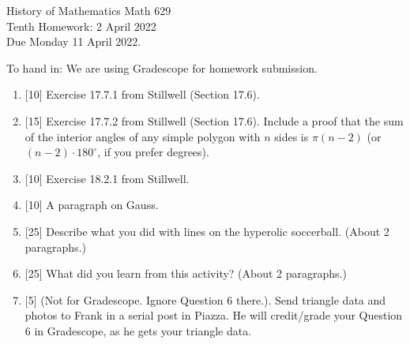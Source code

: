 \documentclass[12pt]{article}
\begin{document}
\LARGE 
\noindent
{\color{Maroon}History of Mathematics \hfill Math 629}\vspace{2pt}\\
\large
Tenth Homework: \hfill 2 April 2022\\
Due Monday 11 April 2022.
\normalsize\vspace{10pt}

To hand in: We are using Gradescope for homework submission.


\begin{enumerate}

\item  {[10]}
     Exercise 17.7.1 from Stillwell (Section 17.6).
\item  {[15]}
  Exercise 17.7.2 from Stillwell (Section 17.6).
  Include a proof that the sum of the interior angles of any simple polygon with $n$ sides is $\pi(n-2)$ (or $(n-2)\cdot 180^\circ$,
  if you prefer degrees).

\item  {[10]}
  Exercise 18.2.1 from Stillwell.
  
\item{[10]} A paragraph on Gauss.

\item  {[25]}
     Describe what you did with lines on the hyperolic soccerball.  (About 2 paragraphs.)
\item  {[25]}
       What did you learn from this activity?  (About 2 paragraphs.)
\item {[5]}
  (Not for Gradescope. Ignore Question 6 there.).  Send triangle data and photos to Frank in a serial post in Piazza.
  He will credit/grade your Question 6 in Gradescope, as he gets your triangle data.


  \end{enumerate}
\end{document}
